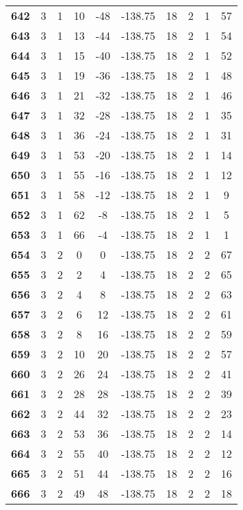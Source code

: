 \documentclass[12pt,letterpaper, onecolumn]{exam}
\begin{document}
\begin{longtable}{cccccccccc}
    \textbf{642} & 3 & 1 & 10 & -48 & -138.75 & 18 & 2 & 1 & 57 \\ 
    \textbf{643} & 3 & 1 & 13 & -44 & -138.75 & 18 & 2 & 1 & 54 \\ 
    \textbf{644} & 3 & 1 & 15 & -40 & -138.75 & 18 & 2 & 1 & 52 \\ 
    \textbf{645} & 3 & 1 & 19 & -36 & -138.75 & 18 & 2 & 1 & 48 \\ 
    \textbf{646} & 3 & 1 & 21 & -32 & -138.75 & 18 & 2 & 1 & 46 \\ 
    \textbf{647} & 3 & 1 & 32 & -28 & -138.75 & 18 & 2 & 1 & 35 \\      \hline
    \textbf{648} & 3 & 1 & 36 & -24 & -138.75 & 18 & 2 & 1 & 31 \\ 
    \textbf{649} & 3 & 1 & 53 & -20 & -138.75 & 18 & 2 & 1 & 14 \\ 
    \textbf{650} & 3 & 1 & 55 & -16 & -138.75 & 18 & 2 & 1 & 12 \\ 
    \textbf{651} & 3 & 1 & 58 & -12 & -138.75 & 18 & 2 & 1 & 9 \\ 
    \textbf{652} & 3 & 1 & 62 & -8 & -138.75 & 18 & 2 & 1 & 5 \\ 
    \textbf{653} & 3 & 1 & 66 & -4 & -138.75 & 18 & 2 & 1 & 1 \\ 
    \textbf{654} & 3 & 2 & 0 & 0 & -138.75 & 18 & 2 & 2 & 67 \\ 
    \textbf{655} & 3 & 2 & 2 & 4 & -138.75 & 18 & 2 & 2 & 65 \\ 
    \textbf{656} & 3 & 2 & 4 & 8 & -138.75 & 18 & 2 & 2 & 63 \\ 
    \textbf{657} & 3 & 2 & 6 & 12 & -138.75 & 18 & 2 & 2 & 61 \\ 
    \textbf{658} & 3 & 2 & 8 & 16 & -138.75 & 18 & 2 & 2 & 59 \\ 
    \textbf{659} & 3 & 2 & 10 & 20 & -138.75 & 18 & 2 & 2 & 57 \\ 
    \textbf{660} & 3 & 2 & 26 & 24 & -138.75 & 18 & 2 & 2 & 41 \\ 
    \textbf{661} & 3 & 2 & 28 & 28 & -138.75 & 18 & 2 & 2 & 39 \\ 
    \textbf{662} & 3 & 2 & 44 & 32 & -138.75 & 18 & 2 & 2 & 23 \\ 
    \textbf{663} & 3 & 2 & 53 & 36 & -138.75 & 18 & 2 & 2 & 14 \\ 
    \textbf{664} & 3 & 2 & 55 & 40 & -138.75 & 18 & 2 & 2 & 12 \\ 
    \textbf{665} & 3 & 2 & 51 & 44 & -138.75 & 18 & 2 & 2 & 16 \\ 
    \textbf{666} & 3 & 2 & 49 & 48 & -138.75 & 18 & 2 & 2 & 18 \\ 

\end{longtable}
\end{document}
